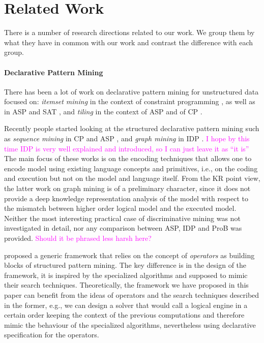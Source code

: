 \documentclass{article}
\theoremstyle{definition}
\newcommand{\sergey}[1]{\textcolor{magenta}{\marginpar{\sc Sergey} #1}}
\begin{document}

\section{Related Work}
There is a number of research directions related to our work. We group them by what they have in common with our work and contrast the difference with each group.

\paragraph{Declarative Pattern Mining} There has been a lot of work on declarative pattern mining for unstructured data focused on: \textit{itemset mining} in the context of constraint programming \citep{tias_original,mining_cp_extra,tias_declarative_pattern_mining}, as well as in ASP \citep{asp_itemset} and SAT \citep{itemset_sat}, and \textit{tiling} in the context of ASP \citep{relational_decomposition} and of CP \citep{ranked_tiling}. 

Recently people started looking at the structured declarative pattern mining such as \textit{sequence mining} in CP \citep{cp_sequence_mining} and ASP \citep{rennes_asp_sequences}, and \textit{graph mining} in IDP \citep{ilp_graph_mining}. \sergey{I hope by this time IDP is very well explained and introduced, so I can just leave it as ``it is''} The main focus of these works is on the encoding techniques that allows one to encode model using existing language concepts and primitives, i.e., on the coding and execution but not on the model and language itself. From the KR point view, the latter work on graph mining is of a preliminary character, since it does not provide a deep knowledge representation analysis of the model with respect to the mismatch between higher order logical model and the executed model. Neither the most interesting practical case of discriminative mining was not investigated in detail, nor any comparison between ASP, IDP and ProB was provided. \sergey{Should it be phrased less harsh here?}

\citet{declarative_structured_language} proposed a generic framework that relies on the concept of \textit{operators} as building blocks of structured pattern mining. The key difference is in the design of the framework, it is inspired by the specialized algorithms and supposed to mimic their search techniques. Theoretically, the framework we have proposed in this paper can benefit from the ideas of operators and the search techniques described in the former, e.g., we can design a solver that would call a logical engine in a certain order keeping the context of the previous computations and therefore mimic the behaviour of the specialized algorithms, nevertheless using declarative specification for the operators.
\end{document}
